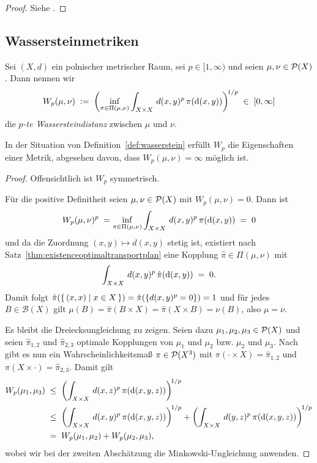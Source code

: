 \documentclass[../main/main.tex]{subfiles}
\begin{document}
	\begin{proof}
		Siehe \cite[Folgerung 5.21]{Villani.2009}.
	\end{proof}

	\subsection{Wassersteinmetriken}

	\begin{Definition}
		\label{def:wasserstein}
		Sei $(X, d)$ ein polnischer metrischer Raum, sei $p \in [1, \infty)$ und seien $\mu, \nu \in \mathcal{P}(X)$. Dann nennen wir
		$$ W_p(\mu, \nu) \; \vcentcolon = \; \left(\inf_{\pi \in \Pi(\mu, \nu)} \int_{X \times X} \, d(x, y)^p \, \pi(\mathrm{d}(x, y))\right)^{\! 1/p} \; \in \; [0, \infty] $$
		die \emph{$p$-te Wassersteindistanz} zwischen $\mu$ und $\nu$.
	\end{Definition}

	\begin{Satz}
		\label{thm:wassersteinismetric}
		In der Situation von Definition~\ref{def:wasserstein} erfüllt $W_p$ die Eigenschaften einer Metrik, abgesehen davon, dass $W_p(\mu, \nu) = \infty$ möglich ist.
	\end{Satz}

	\begin{proof}
		Offensichtlich ist $W_p$ symmetrisch.
		
		Für die positive Definitheit seien $\mu, \nu \in \mathcal{P}(X)$ mit $W_p(\mu, \nu) = 0$. Dann ist
		\[ W_p(\mu, \nu)^p \; = \inf_{\pi \in \Pi(\mu, \nu)} \int_{X \times X} \, d(x, y)^p \, \pi(\mathrm{d}(x, y)) \; = \; 0 \]
		und da die Zuordnung $(x, y) \mapsto d(x, y)$ stetig ist, existiert nach Satz~\ref{thm:existenceoptimaltransportplan} eine Kopplung $\hat{\pi} \in \Pi(\mu, \nu)$ mit
		\[ \int_{X \times X} \, d(x, y)^p \, \hat{\pi}(\mathrm{d}(x, y)) \; = \; 0 \text{.} \]
		Damit folgt $\hat{\pi}(\left\{\, (x, x) \; \middle| \; x \in X \,\right\}) = \hat{\pi}(\left\{d(x, y)^p = 0\right\}) = 1$ und für jedes $B \in \mathcal{B}(X)$ gilt
		$\mu(B) = \hat{\pi}(B \times X) = \hat{\pi}(X \times B) = \nu(B)$, also $\mu = \nu$.
		
		Es bleibt die Dreiecksungleichung zu zeigen. Seien dazu $\mu_1, \mu_2, \mu_3 \in \mathcal{P}(X)$ und seien $\hat{\pi}_{1, 2}$ und $\hat{\pi}_{2, 3}$ optimale Kopplungen von
		$\mu_1$ und $\mu_2$ bzw. $\mu_2$ und $\mu_3$. Nach \cite[S. 23-24]{Villani.2009} gibt es nun ein Wahrscheinlichkeitsmaß $\pi \in \mathcal{P}(X^3)$ mit 
		$\pi(\cdot \times X) = \hat{\pi}_{1, 2}$ und $\pi(X \times \cdot) = \hat{\pi}_{2, 3}$. Damit gilt
		\begin{align*}
			W_p(\mu_1, \mu_3) \; &\leq \; \left(\int_{X \times X} \, d(x, z)^p \, \pi(\mathrm{d}(x, y, z))\right)^{\! 1/p} \\
			                     &\leq \; \left(\int_{X \times X} \, d(x, y)^p \, \pi(\mathrm{d}(x, y, z))\right)^{\! 1/p} + \left(\int_{X \times X} \, d(y, z)^p \, \pi(\mathrm{d}(x, y, z))\right)^{\! 1/p} \\
			                     &=    \; W_p(\mu_1, \mu_2) + W_p(\mu_2, \mu_3) \text{,}
		\end{align*}
		wobei wir bei der zweiten Abschätzung die Minkowski-Ungleichung anwenden.
	\end{proof}
\end{document}
